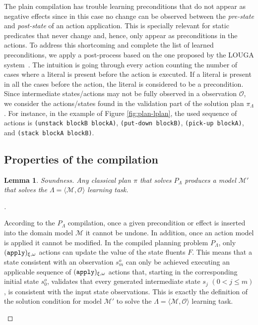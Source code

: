 \documentclass[runningheads]{llncs}
\newcommand{\tup}[1]{{\langle #1 \rangle}}
\newtheorem{mylemma}[mytheorem]{Lemma}
\begin{document}
The plain compilation has trouble learning preconditions that do not appear as negative effects since in this case no change can be observed between the {\em pre-state} and {\em post-state} of an action application. This is specially relevant for static predicates that never change and, hence, only appear as preconditions in the actions. To address this shortcoming and complete the list of learned preconditions, we apply a post-process based on the one proposed by the {\sc LOUGA} system~\cite{kuvcera2018louga}. The intuition is going through every action counting the number of cases where a literal is present before the action is executed. If a literal is present in all the cases before the action, the literal is considered to be a precondition. Since intermediate states/actions may not be fully observed in a observation $\mathcal{O}$, we consider the actions/states found in the validation part of the solution plan $\pi_\Lambda$. For instance, in the example of Figure \ref{fig:plan-lplan}, the used sequence of actions is {\tt\small(unstack blockB blockA)}, {\tt\small(put-down blockB)}, {\tt\small(pick-up blockA)}, and {\tt\small(stack blockA blockB)}.

\subsection{Properties of the compilation}
\begin{mylemma}
Soundness. Any classical plan $\pi$ that solves $P_{\Lambda}$ produces a model $\mathcal{M'}$ that solves the $\Lambda=\tup{\mathcal{M},{\mathcal O}}$ learning task.
\end{mylemma}

\begin{proof}[]
\begin{small}
According to the $P_{\Lambda}$ compilation, once a given precondition or effect is inserted into the domain model $\mathcal{M}$ it cannot be undone. In addition, once an action model is applied it cannot be modified. In the compiled planning problem $P_{\Lambda}$, only ${\tt \small (apply)_{\xi,\omega}}$ actions can update the value of the state fluents $F$. This means that a state consistent with an observation $s_m^o$ can only be achieved executing an applicable sequence of ${\tt \small (apply)_{\xi,\omega}}$ actions that, starting in the corresponding initial state $s_0^o$, validates that every generated intermediate state $s_j$ $(0 < j\leq m)$, is consistent with the input state observations. This is exactly the definition of the solution condition for model $\mathcal{M}'$ to solve the $\Lambda=\tup{\mathcal{M},{\mathcal O}}$ learning task.
\end{small}
\end{proof}
\end{document}
